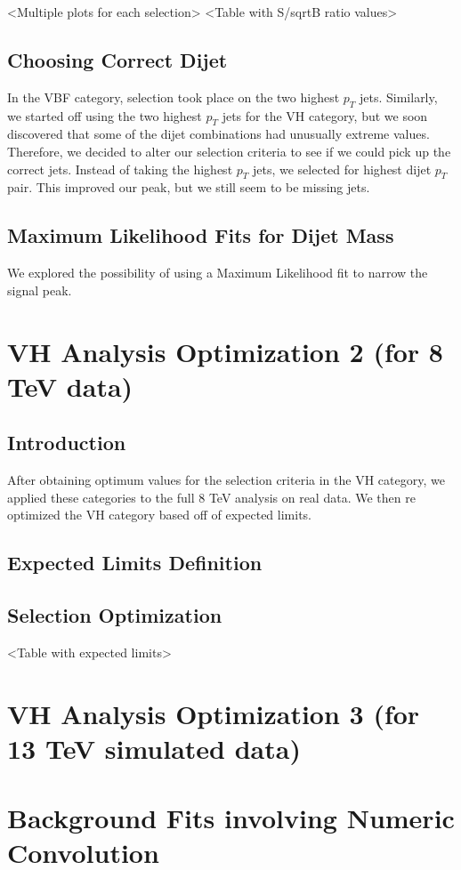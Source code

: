 \documentclass[12pt]{article}
\begin{document}
 
<Multiple plots for each selection>
<Table with S/sqrtB ratio values>
\subsection{Choosing Correct Dijet}
In the VBF category, selection took place on the two highest $p_{T}$ jets. Similarly, we started off using the two highest $p_{T}$ jets for the VH category, but we soon discovered that some of the dijet combinations had unusually extreme values. Therefore, we decided to alter our selection criteria to see if we could pick up the correct jets. Instead of taking the highest $p_{T}$ jets, we selected for highest dijet $p_{T}$ pair. This improved our peak, but we still seem to be missing jets.
\subsection{Maximum Likelihood Fits for Dijet Mass}
We explored the possibility of using a Maximum Likelihood fit to narrow the signal peak.
\section{VH Analysis Optimization 2 (for 8 TeV data)}
\subsection{Introduction}
After obtaining optimum values for the selection criteria in the VH category, we applied these categories to the full 8 TeV analysis on real data. We then re optimized the VH category based off of expected limits. 
\subsection{Expected Limits Definition}
\subsection{Selection Optimization}
<Table with expected limits>
\section{VH Analysis Optimization 3 (for 13 TeV simulated data)}
\section{Background Fits involving Numeric Convolution}
\end{document}
